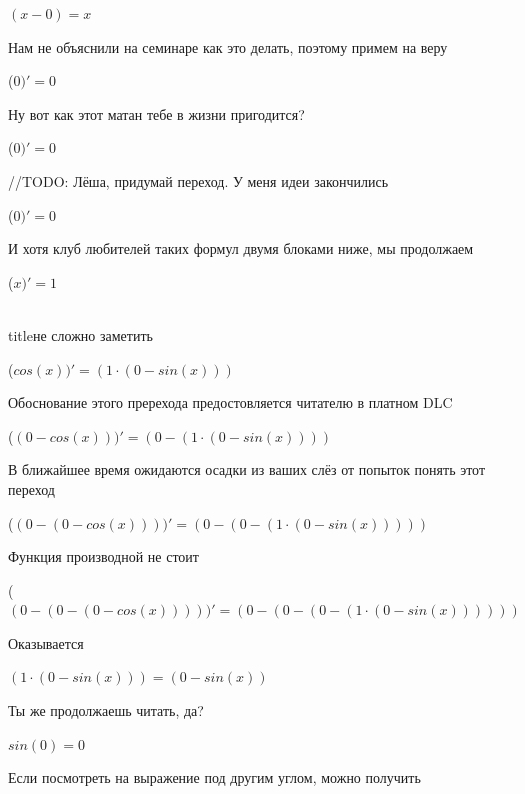 \documentclass[12pt,a4paper,fleqn]{article}
\begin{document}
\begin{center}
\begin{center}
\begin{center}
\begin{center}
\begin{center}
\begin{center}
\begin{center}
\begin{center}
\begin{center}
\begin{center}
\begin{center}
\begin{center}
\begin{center}
\begin{center}
\begin{center}
\begin{center}
\begin{center}
\begin{center}
\begin{center}
\begin{center}
\begin{center}
\begin{center}
\begin{center}
\begin{center}
\begin{center}
\begin{center}
\begin{center}
\begin{center}
$(x-0) = x$\end{center}
Нам не объяснили на семинаре как это делать, поэтому примем на веру

\begin{center}
 ($0)'
  = 0$\end{center}
Ну вот как этот матан тебе в жизни пригодится?

\begin{center}
 ($0)'
  = 0$\end{center}
//TODO: Лёша, придумай переход. У меня идеи закончились

\begin{center}
 ($0)'
  = 0$\end{center}
И хотя клуб любителей таких формул двумя блоками ниже, мы продолжаем

\begin{center}
 ($x)'
  = 1$\end{center}
\\ title{не сложно заметить} 

\begin{center}
 ($cos(x))'
  = (1 \cdot (0-sin(x)))$\end{center}
Обоснование этого пререхода предостовляется читателю в платном DLC

\begin{center}
 ($(0-cos(x)))'
  = (0-(1 \cdot (0-sin(x))))$\end{center}
В ближайшее время ожидаются осадки из ваших слёз от попыток понять этот переход

\begin{center}
 ($(0-(0-cos(x))))'
  = (0-(0-(1 \cdot (0-sin(x)))))$\end{center}
Функция производной не стоит\cite{link2}

\begin{center}
 ($(0-(0-(0-cos(x)))))'
  = (0-(0-(0-(1 \cdot (0-sin(x))))))$\end{center}
Оказывается

\begin{center}
$(1 \cdot (0-sin(x))) = (0-sin(x))$\end{center}
Ты же продолжаешь читать, да?

\begin{center}
\begin{center}$sin(0) = 0$\end{center}
Если посмотреть на выражение под другим углом, можно получить


\end{center}
\end{center}
\end{center}
\end{center}
\end{center}
\end{center}
\end{center}
\end{center}
\end{center}
\end{center}
\end{center}
\end{center}
\end{center}
\end{center}
\end{center}
\end{center}
\end{center}
\end{center}
\end{center}
\end{center}
\end{center}
\end{center}
\end{center}
\end{center}
\end{center}
\end{center}
\end{center}
\end{center}
\end{document}
